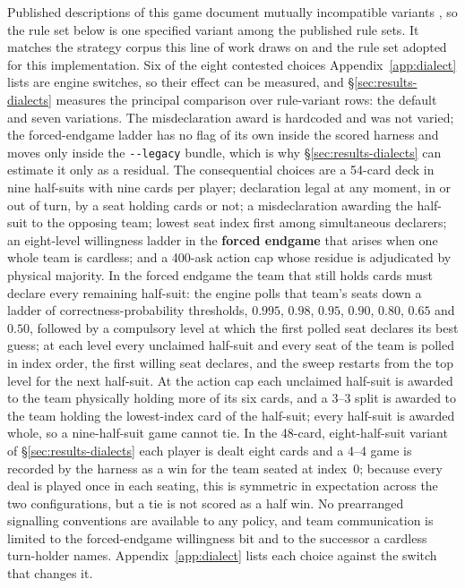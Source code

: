 Published descriptions of this game document mutually incompatible variants \cite{pagat}, so the rule
set below is one specified variant among the published rule sets. It matches the strategy corpus
this line of work draws on \cite{develin} and the rule set adopted for this implementation. Six of
the eight contested choices Appendix~\ref{app:dialect} lists are engine switches, so their effect
can be measured, and \S\ref{sec:results-dialects} measures the principal comparison over
\vsevenDiaRowsWord{} rule-variant rows: the default and seven variations. The misdeclaration award
is hardcoded and was not varied; the forced-endgame ladder has no flag of its own inside the scored
harness and moves only inside the \texttt{-{}-legacy} bundle, which is why
\S\ref{sec:results-dialects} can estimate it only as a residual. The consequential choices are a
54-card deck in nine half-suits with nine cards per player; declaration legal at any moment, in or out
of turn, by a seat holding cards or not; a misdeclaration awarding the half-suit to the opposing team;
lowest seat index first among simultaneous declarers; an eight-level willingness ladder in the
\textbf{forced endgame} that arises when one whole team is cardless; and a 400-ask action cap whose
residue is adjudicated by physical majority. In the forced endgame the team that still holds cards
must declare every remaining half-suit: the engine polls that team's seats down a ladder of
correctness-probability thresholds, $0.995$, $0.98$, $0.95$, $0.90$, $0.80$, $0.65$ and $0.50$,
followed by a compulsory level at which the first polled seat declares its best guess; at each
level every unclaimed half-suit and every seat of the team is polled in index order, the first
willing seat declares, and the sweep restarts from the top level for the next half-suit. At the
action cap each unclaimed half-suit is awarded to the team physically holding more of its six
cards, and a 3--3 split is awarded to the team holding the lowest-index card of the half-suit; every
half-suit is awarded whole, so a nine-half-suit game cannot tie. In the 48-card, eight-half-suit
variant of \S\ref{sec:results-dialects} each player is dealt eight cards and a 4--4 game is recorded
by the harness as a win for the team seated at index~0; because every deal is played once in each
seating, this is symmetric in expectation across the two configurations, but a tie is not scored as
a half win. No prearranged signalling conventions are available to any policy, and team
communication is limited to the forced-endgame willingness bit and to the successor a cardless
turn-holder names. Appendix~\ref{app:dialect} lists each choice against the switch that changes it.

